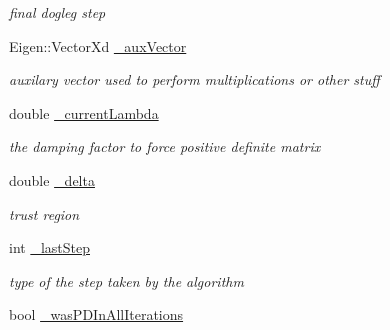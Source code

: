 \begin{DoxyCompactItemize}
\begin{DoxyCompactList}\small\item\em final dogleg step \end{DoxyCompactList}\item 
\hypertarget{classg2o_1_1OptimizationAlgorithmDogleg_a225092fe67ce75eb64011c1f45d8d936}{Eigen\-::\-Vector\-Xd \hyperlink{classg2o_1_1OptimizationAlgorithmDogleg_a225092fe67ce75eb64011c1f45d8d936}{\-\_\-aux\-Vector}}\label{classg2o_1_1OptimizationAlgorithmDogleg_a225092fe67ce75eb64011c1f45d8d936}

\begin{DoxyCompactList}\small\item\em auxilary vector used to perform multiplications or other stuff \end{DoxyCompactList}\item 
\hypertarget{classg2o_1_1OptimizationAlgorithmDogleg_aacc051a6740fc6017dac7c424dc7df3d}{double \hyperlink{classg2o_1_1OptimizationAlgorithmDogleg_aacc051a6740fc6017dac7c424dc7df3d}{\-\_\-current\-Lambda}}\label{classg2o_1_1OptimizationAlgorithmDogleg_aacc051a6740fc6017dac7c424dc7df3d}

\begin{DoxyCompactList}\small\item\em the damping factor to force positive definite matrix \end{DoxyCompactList}\item 
\hypertarget{classg2o_1_1OptimizationAlgorithmDogleg_a3484b12efddd9fc0051100634effecd6}{double \hyperlink{classg2o_1_1OptimizationAlgorithmDogleg_a3484b12efddd9fc0051100634effecd6}{\-\_\-delta}}\label{classg2o_1_1OptimizationAlgorithmDogleg_a3484b12efddd9fc0051100634effecd6}

\begin{DoxyCompactList}\small\item\em trust region \end{DoxyCompactList}\item 
\hypertarget{classg2o_1_1OptimizationAlgorithmDogleg_a3bf898af0087c0ed8287d0cd13e4c943}{int \hyperlink{classg2o_1_1OptimizationAlgorithmDogleg_a3bf898af0087c0ed8287d0cd13e4c943}{\-\_\-last\-Step}}\label{classg2o_1_1OptimizationAlgorithmDogleg_a3bf898af0087c0ed8287d0cd13e4c943}

\begin{DoxyCompactList}\small\item\em type of the step taken by the algorithm \end{DoxyCompactList}\item 
\hypertarget{classg2o_1_1OptimizationAlgorithmDogleg_af921ebbebaf059f73e410fc751616ec2}{bool \hyperlink{classg2o_1_1OptimizationAlgorithmDogleg_af921ebbebaf059f73e410fc751616ec2}{\-\_\-was\-P\-D\-In\-All\-Iterations}}\label{classg2o_1_1OptimizationAlgorithmDogleg_af921ebbebaf059f73e410fc751616ec2}


\end{DoxyCompactItemize}
